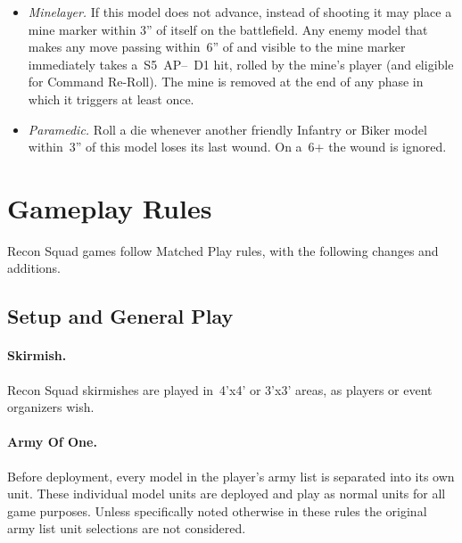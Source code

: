 \begin{itemize}
  \item \emph{Minelayer.}  If this model does not advance, instead of
    shooting it may place a mine marker within 3'' of itself on the
    battlefield.  Any enemy model that makes any move passing
    within~6'' of and visible to the mine marker immediately takes
    a~S5~AP--~D1 hit, rolled by the mine's player (and eligible
    for Command Re-Roll).  The mine is removed at the end of any phase in
    which it triggers at least once.

  \item \emph{Paramedic.} Roll a die whenever another friendly
    Infantry or Biker model within~3'' of this model loses its last
    wound.  On a~6+ the wound is ignored.
  \end{itemize}

\clearpage

\section{Gameplay Rules}

Recon Squad games follow Matched Play rules, with the following
changes and additions.

\subsection{Setup and General Play}

\paragraph{Skirmish.} Recon Squad skirmishes are played in~4'x4' or
3'x3' areas, as players or event organizers wish.

\paragraph{Army Of One.}  Before deployment, every model in the
player's army list is separated into its own unit.  These individual
model units are deployed and play as normal units for all game
purposes. Unless specifically noted otherwise in these rules the
original army list unit selections are not considered.



